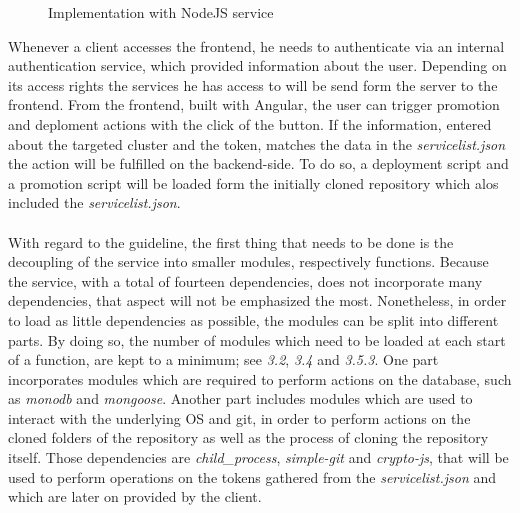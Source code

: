 \documentclass[a4paper,twoside,11pt, pagesize]{scrartcl}
\begin{document}
\begin{spacing}{1.2}
\begin{figure}[H]
\caption{Implementation with NodeJS service}
\end{figure}  
Whenever a client accesses the frontend, he needs to authenticate via an internal authentication service, which provided information about the user. Depending on its access rights the services he has access to will be send form the server to the frontend. From the frontend, built with Angular, the user can trigger promotion and deploment actions with the click of the button. If the information, entered about the targeted cluster and the token, matches the data in the \textit{servicelist.json} the action will be fulfilled on the backend-side. To do so, a deployment script and a promotion script will be loaded form the initially cloned repository which alos included the \textit{servicelist.json}. \\\\With regard to the guideline, the first thing that needs to be done is the decoupling of the service into smaller modules, respectively functions. Because the service, with a total of fourteen dependencies, does not incorporate many dependencies, that aspect will not be emphasized the most. Nonetheless, in order to load as little dependencies as possible, the modules can be split into different parts. By doing so, the number of modules which need to be loaded at each start of a function, are kept to a minimum; see \textit{3.2}, \textit{3.4} and \textit{3.5.3}. One part incorporates modules which are required to perform actions on the database, such as \textit{monodb} and \textit{mongoose}. Another part includes modules which are used to interact with the underlying OS and git, in order to perform actions on the cloned folders of the repository as well as the process of cloning the repository itself. Those dependencies are \textit{child\_process}, \textit{simple-git} and \textit{crypto-js}, that will be used to perform operations on the tokens gathered from the \textit{servicelist.json} and which are later on provided by the client.\\\\

\end{spacing}
\end{document}
